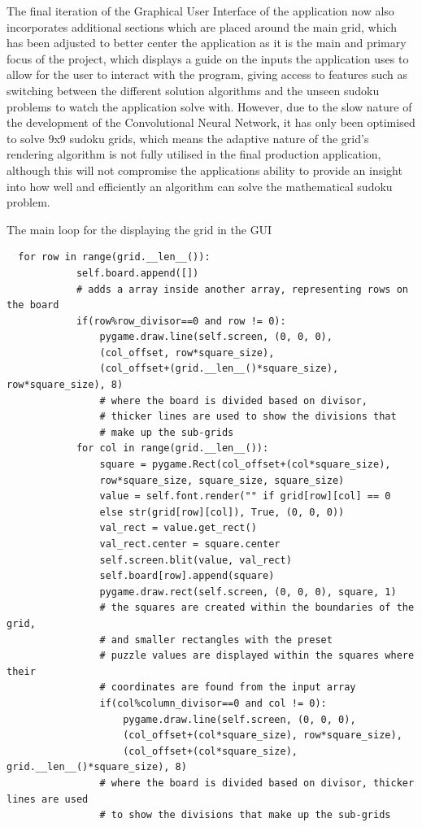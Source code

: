 \documentclass[]{final_report}
\begin{document}
The final iteration of the Graphical User Interface of the application now also incorporates additional sections which are placed around the main grid, which has been adjusted to better center the application as it is the main and primary focus of the project, which displays a guide on the inputs the application uses to allow for the user to interact with the program, giving access to features such as switching between the different solution algorithms and the unseen sudoku problems to watch the application solve with. However, due to the slow nature of the development of the Convolutional Neural Network, it has only been optimised to solve 9x9 sudoku grids, which means the adaptive nature of the grid's rendering algorithm is not fully utilised in the final production application, although this will not compromise the applications ability to provide an insight into how well and efficiently an algorithm can solve the mathematical sudoku problem.

The main loop for the displaying the grid in the GUI
\begin{verbatim}
  for row in range(grid.__len__()):
            self.board.append([])
            # adds a array inside another array, representing rows on the board
            if(row%row_divisor==0 and row != 0):
                pygame.draw.line(self.screen, (0, 0, 0), 
                (col_offset, row*square_size), 
                (col_offset+(grid.__len__()*square_size), row*square_size), 8)
                # where the board is divided based on divisor, 
                # thicker lines are used to show the divisions that 
                # make up the sub-grids
            for col in range(grid.__len__()):
                square = pygame.Rect(col_offset+(col*square_size), 
                row*square_size, square_size, square_size)
                value = self.font.render("" if grid[row][col] == 0 
                else str(grid[row][col]), True, (0, 0, 0))
                val_rect = value.get_rect()
                val_rect.center = square.center
                self.screen.blit(value, val_rect)
                self.board[row].append(square)
                pygame.draw.rect(self.screen, (0, 0, 0), square, 1)
                # the squares are created within the boundaries of the grid,
                # and smaller rectangles with the preset
                # puzzle values are displayed within the squares where their 
                # coordinates are found from the input array
                if(col%column_divisor==0 and col != 0):
                    pygame.draw.line(self.screen, (0, 0, 0), 
                    (col_offset+(col*square_size), row*square_size), 
                    (col_offset+(col*square_size), grid.__len__()*square_size), 8)
                # where the board is divided based on divisor, thicker lines are used 
                # to show the divisions that make up the sub-grids
\end{verbatim}
\end{document}
